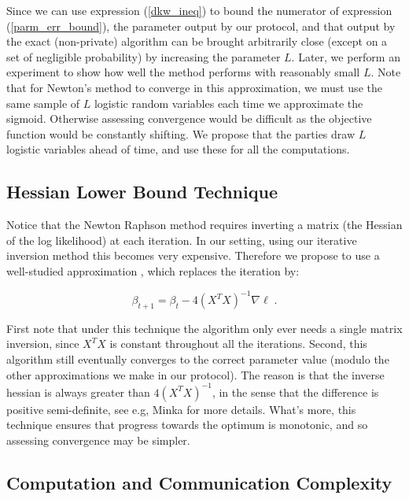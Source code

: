 \documentclass[11pt]{article}
\begin{document}
Since we can use expression (\ref{dkw_ineq})   to bound the numerator of  expression (\ref{parm_err_bound}),   the parameter output by our protocol, and that output by the exact (non-private) algorithm can be brought arbitrarily close (except on a set of negligible probability) by increasing the parameter $L$.  Later, we perform an experiment to show how well the method performs with reasonably small $L$.  Note that for Newton's method to converge in this approximation, we must use the same sample of $L$ logistic random variables each time we approximate the sigmoid.  Otherwise assessing convergence would be difficult as the objective function would be constantly shifting.  We propose that the parties draw $L$ logistic variables ahead of time, and use these for all the computations.

\subsection{Hessian Lower Bound Technique}\label{sec:hess_bound}

Notice that the Newton Raphson method requires inverting a matrix (the Hessian of the log likelihood) at each iteration.  In our setting, using our iterative inversion method this becomes very expensive.  Therefore we propose to use a well-studied approximation \cite{minka}, which replaces the iteration by:

\begin{equation}\label{eq_hessian_lb} \beta_{t+1}=\beta_t - 4(X^TX)^{-1} \nabla \ell \; .
\end{equation}

First note that under this technique the algorithm only ever needs a single matrix inversion, since $X^TX$ is constant throughout all the iterations.  Second, this algorithm still eventually converges to the correct parameter value (modulo the other approximations we make in our protocol).  The reason is that the inverse hessian is always greater than $4(X^TX)^{-1}$, in the sense that the difference is positive semi-definite, see e.g, Minka \cite{minka} for more details.  What's more, this technique ensures that progress towards the optimum is monotonic,  and so  assessing convergence may be simpler.

\subsection{Computation and Communication Complexity}\label{sec:complexity_1}
\end{document}

